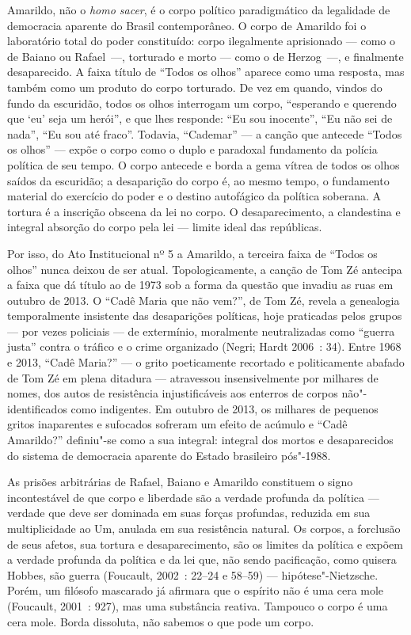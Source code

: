 Amarildo, não o \emph{homo sacer}, é o corpo político paradigmático da
legalidade de democracia aparente do Brasil contemporâneo. O corpo de
Amarildo foi o laboratório total do poder constituído: corpo ilegalmente
aprisionado --- como o de Baiano ou Rafael~---, torturado e morto --- como
o de Herzog~---, e finalmente desaparecido. A faixa título de ``Todos os
olhos'' aparece como uma resposta, mas também como um produto do corpo
torturado. De vez em quando, vindos do fundo da escuridão, todos os
olhos interrogam um corpo, ``esperando e querendo que `eu' seja um
herói'', e que lhes responde: ``Eu sou inocente'', ``Eu não sei de
nada'', ``Eu sou até fraco''. Todavia, ``Cademar'' --- a canção que
antecede ``Todos os olhos'' --- expõe o corpo como o duplo e paradoxal
fundamento da polícia política de seu tempo. O corpo antecede e borda a
gema vítrea de todos os olhos saídos da escuridão; a desaparição do
corpo é, ao mesmo tempo, o fundamento material do exercício do poder e o
destino autofágico da política soberana. A tortura é a inscrição obscena
da lei no corpo. O desaparecimento, a clandestina e integral absorção do
corpo pela lei --- limite ideal das repúblicas.

Por isso, do Ato Institucional nº 5 a Amarildo, a terceira faixa de
``Todos os olhos'' nunca deixou de ser atual. Topologicamente, a canção
de Tom Zé antecipa a faixa que dá título ao  de 1973 sob a forma da
questão que invadiu as ruas em outubro de 2013. O ``Cadê Maria que não
vem?'', de Tom Zé, revela a genealogia temporalmente insistente das
desaparições políticas, hoje praticadas pelos grupos --- por vezes
policiais --- de extermínio, moralmente neutralizadas como ``guerra
justa'' contra o tráfico e o crime organizado (Negri; Hardt 2006~: 34).
Entre 1968 e 2013, ``Cadê Maria?'' --- o grito poeticamente recortado e
politicamente abafado de Tom Zé em plena ditadura --- atravessou
insensivelmente por milhares de nomes, dos autos de resistência
injustificáveis aos enterros de corpos não"-identificados como
indigentes. Em outubro de 2013, os milhares de pequenos gritos
inaparentes e sufocados sofreram um efeito de acúmulo e ``Cadê
Amarildo?'' definiu"-se como a sua integral: integral dos mortos e
desaparecidos do sistema de democracia aparente do Estado brasileiro
pós"-1988.

As prisões arbitrárias de Rafael, Baiano e Amarildo constituem o signo
incontestável de que corpo e liberdade são a verdade profunda da
política --- verdade que deve ser dominada em suas forças profundas,
reduzida em sua multiplicidade ao Um, anulada em sua resistência
natural. Os corpos, a forclusão de seus afetos, sua tortura e
desaparecimento, são os limites da política e expõem a verdade profunda
da política e da lei que, não sendo pacificação, como quisera Hobbes,
são guerra (Foucault, 2002~: 22--24 e 58--59) --- hipótese"-Nietzsche.
Porém, um filósofo mascarado já afirmara que o espírito não é uma cera
mole (Foucault, 2001~: 927), mas uma substância reativa. Tampouco o
corpo é uma cera mole. Borda dissoluta, não sabemos o que pode um corpo.

